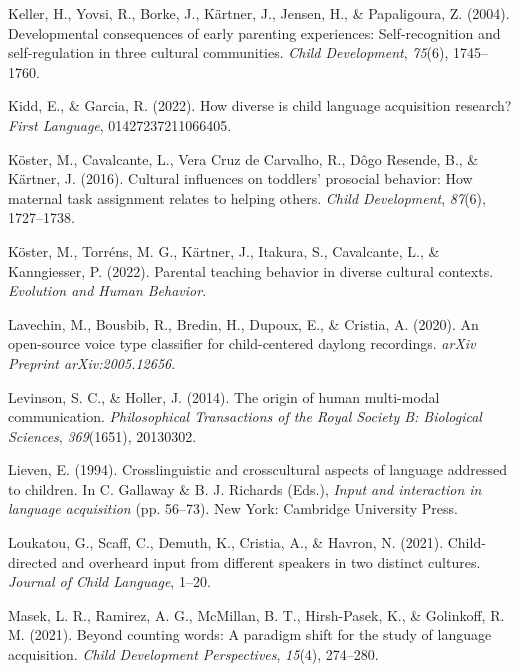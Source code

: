 \documentclass[
  man,floatsintext]{apa6}
\newlength{\cslhangindent}
\newlength{\cslentryspacingunit} %
\newenvironment{CSLReferences}[2] %
 {%
  \setlength{\parindent}{0pt}
  \ifodd #1
  \let\oldpar\par
  \def\par{\hangindent=\cslhangindent\oldpar}
  \fi
  \setlength{\parskip}{#2\cslentryspacingunit}
 }%
 {}
\begin{document}
\begin{CSLReferences}{1}{0}
\leavevmode{}%
Keller, H., Yovsi, R., Borke, J., Kärtner, J., Jensen, H., \& Papaligoura, Z. (2004). Developmental consequences of early parenting experiences: Self-recognition and self-regulation in three cultural communities. \emph{Child Development}, \emph{75}(6), 1745--1760.

\leavevmode{}%
Kidd, E., \& Garcia, R. (2022). How diverse is child language acquisition research? \emph{First Language}, 01427237211066405.

\leavevmode{}%
Köster, M., Cavalcante, L., Vera Cruz de Carvalho, R., Dôgo Resende, B., \& Kärtner, J. (2016). Cultural influences on toddlers' prosocial behavior: How maternal task assignment relates to helping others. \emph{Child Development}, \emph{87}(6), 1727--1738.

\leavevmode{}%
Köster, M., Torréns, M. G., Kärtner, J., Itakura, S., Cavalcante, L., \& Kanngiesser, P. (2022). Parental teaching behavior in diverse cultural contexts. \emph{Evolution and Human Behavior}.

\leavevmode{}%
Lavechin, M., Bousbib, R., Bredin, H., Dupoux, E., \& Cristia, A. (2020). An open-source voice type classifier for child-centered daylong recordings. \emph{arXiv Preprint arXiv:2005.12656}.

\leavevmode{}%
Levinson, S. C., \& Holler, J. (2014). The origin of human multi-modal communication. \emph{Philosophical Transactions of the Royal Society B: Biological Sciences}, \emph{369}(1651), 20130302.

\leavevmode{}%
Lieven, E. (1994). Crosslinguistic and crosscultural aspects of language addressed to children. In C. Gallaway \& B. J. Richards (Eds.), \emph{Input and interaction in language acquisition} (pp. 56--73). New York: Cambridge University Press.

\leavevmode{}%
Loukatou, G., Scaff, C., Demuth, K., Cristia, A., \& Havron, N. (2021). Child-directed and overheard input from different speakers in two distinct cultures. \emph{Journal of Child Language}, 1--20.

\leavevmode{}%
Masek, L. R., Ramirez, A. G., McMillan, B. T., Hirsh-Pasek, K., \& Golinkoff, R. M. (2021). Beyond counting words: A paradigm shift for the study of language acquisition. \emph{Child Development Perspectives}, \emph{15}(4), 274--280.


\end{CSLReferences}
\end{document}
